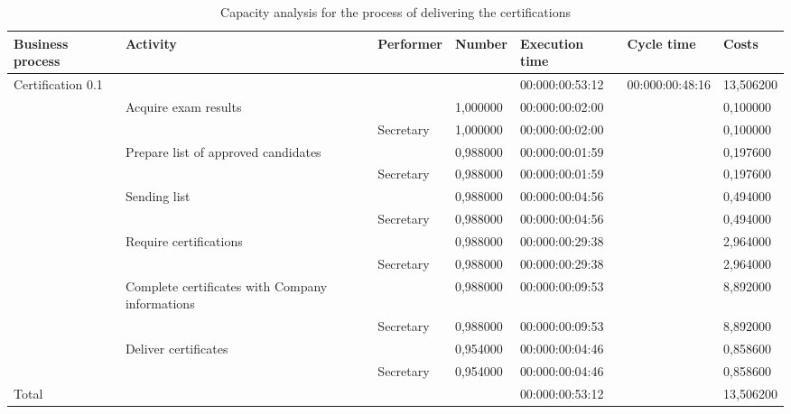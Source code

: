 \begin{landscape}
\centering
\begin{table}
{\tiny
\begin{tabular}{|l|l|l|l|l|l|l|}
Business process&Activity&Performer&Number&Execution time&Cycle
time&Costs\\
\hline
Certification 0.1&&&&00:000:00:53:12&00:000:00:48:16&13,506200\\
\hline
&Acquire exam results &&1,000000&00:000:00:02:00&&0,100000\\
\hline
&&Secretary &1,000000&00:000:00:02:00&&0,100000\\
\hline
&Prepare list of approved candidates &&0,988000&00:000:00:01:59&&0,197600\\
\hline
&&Secretary &0,988000&00:000:00:01:59&&0,197600\\
\hline
&Sending list &&0,988000&00:000:00:04:56&&0,494000\\
\hline
&&Secretary &0,988000&00:000:00:04:56&&0,494000\\
\hline
&Require certifications &&0,988000&00:000:00:29:38&&2,964000\\
\hline
&&Secretary &0,988000&00:000:00:29:38&&2,964000\\
\hline
&Complete certificates with Company informations &&0,988000&00:000:00:09:53&&8,892000\\
\hline
&&Secretary &0,988000&00:000:00:09:53&&8,892000\\
\hline
&Deliver certificates &&0,954000&00:000:00:04:46&&0,858600\\
\hline
&&Secretary &0,954000&00:000:00:04:46&&0,858600\\
\hline
Total&&&&00:000:00:53:12&&13,506200\\
\hline
\end{tabular}
}
\caption{Capacity analysis for the process of delivering the certifications} 
\label{2tab:certs}
\end{table}
\end{landscape}

